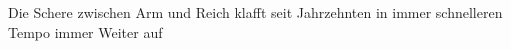 Die Schere zwischen Arm und Reich klafft seit Jahrzehnten in immer schnelleren Tempo immer Weiter auf